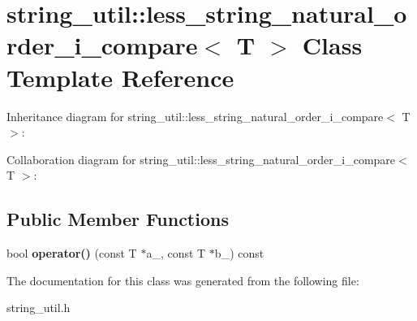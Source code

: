 \section{string\+\_\+util\+:\+:less\+\_\+string\+\_\+natural\+\_\+order\+\_\+i\+\_\+compare$<$ T $>$ Class Template Reference}
\label{classstring__util_1_1less__string__natural__order__i__compare}


Inheritance diagram for string\+\_\+util\+:\+:less\+\_\+string\+\_\+natural\+\_\+order\+\_\+i\+\_\+compare$<$ T $>$\+:


Collaboration diagram for string\+\_\+util\+:\+:less\+\_\+string\+\_\+natural\+\_\+order\+\_\+i\+\_\+compare$<$ T $>$\+:
\subsection*{Public Member Functions}
\begin{DoxyCompactItemize}
\item 
bool {\bfseries operator()} (const T $\ast$a\+\_\+, const T $\ast$b\+\_\+) const \label{classstring__util_1_1less__string__natural__order__i__compare_a213ba84bcb81fa025951194acbdb899c}

\end{DoxyCompactItemize}


The documentation for this class was generated from the following file\+:\begin{DoxyCompactItemize}
\item 
string\+\_\+util.\+h\end{DoxyCompactItemize}
